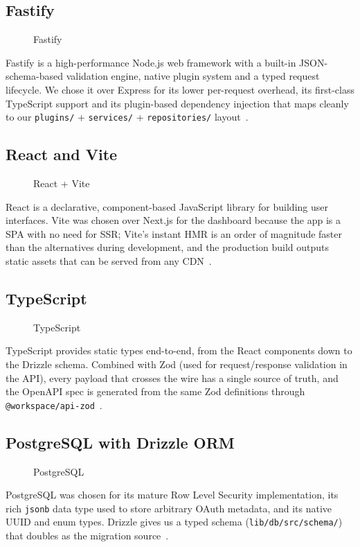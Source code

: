 \subsection{Fastify}
\label{sec:fastify}
\begin{figure}[H]
  \centering
  \caption{Fastify}
  \label{fig:fastify}
\end{figure}
Fastify is a high-performance Node.js web framework with a built-in JSON-schema-based
validation engine, native plugin system and a typed request lifecycle. We chose it over
Express for its lower per-request overhead, its first-class TypeScript support and its
plugin-based dependency injection that maps cleanly to our \texttt{plugins/} +
\texttt{services/} + \texttt{repositories/} layout~\cite{fastify}.

\subsection{React and Vite}
\label{sec:react}
\begin{figure}[H]
  \centering
  \caption{React + Vite}
  \label{fig:react}
\end{figure}
React is a declarative, component-based JavaScript library for building user interfaces.
Vite was chosen over Next.js for the dashboard because the app is a SPA with no need for
SSR; Vite's instant HMR is an order of magnitude faster than the alternatives during
development, and the production build outputs static assets that can be served from any
CDN~\cite{react,vite}.

\subsection{TypeScript}
\label{sec:ts}
\begin{figure}[H]
  \centering
  \caption{TypeScript}
  \label{fig:ts}
\end{figure}
TypeScript provides static types end-to-end, from the React components down to the Drizzle
schema. Combined with Zod (used for request/response validation in the API), every payload
that crosses the wire has a single source of truth, and the OpenAPI spec is generated from
the same Zod definitions through \texttt{@workspace/api-zod}~\cite{ts}.

\subsection{PostgreSQL with Drizzle ORM}
\label{sec:pg}
\begin{figure}[H]
  \centering
  \caption{PostgreSQL}
  \label{fig:postgres}
\end{figure}
PostgreSQL was chosen for its mature Row Level Security implementation, its rich
\texttt{jsonb} data type used to store arbitrary OAuth metadata, and its native UUID and
enum types. Drizzle gives us a typed schema (\texttt{lib/db/src/schema/}) that doubles as
the migration source~\cite{postgres,drizzle}.

